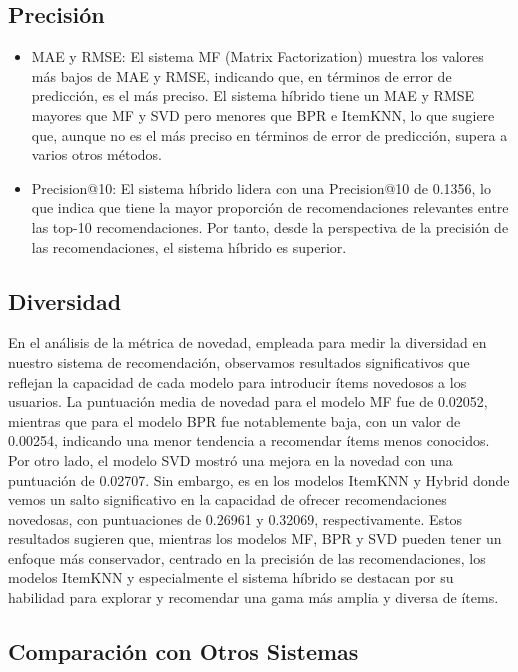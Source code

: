 \documentclass[runningheads]{llncs}
\begin{document}
    \subsection{Precisión}
    \begin{itemize}
    \item MAE y RMSE: El sistema MF (Matrix Factorization) muestra los valores más bajos de MAE y RMSE, indicando que, en términos de error de predicción, es el más preciso. El sistema híbrido tiene un MAE y RMSE mayores que MF y SVD pero menores que BPR e ItemKNN, lo que sugiere que, aunque no es el más preciso en términos de error de predicción, supera a varios otros métodos.
    
    \item Precision@10: El sistema híbrido lidera con una Precision@10 de 0.1356, lo que indica que tiene la mayor proporción de recomendaciones relevantes entre las top-10 recomendaciones. Por tanto, desde la perspectiva de la precisión de las recomendaciones, el sistema híbrido es superior.
    \end{itemize}
    

    \subsection{Diversidad}
    En el análisis de la métrica de novedad, empleada para medir la diversidad en nuestro sistema de recomendación, observamos resultados significativos que reflejan la capacidad de cada modelo para introducir ítems novedosos a los usuarios. La puntuación media de novedad para el modelo MF fue de 0.02052, mientras que para el modelo BPR fue notablemente baja, con un valor de 0.00254, indicando una menor tendencia a recomendar ítems menos conocidos. Por otro lado, el modelo SVD mostró una mejora en la novedad con una puntuación de 0.02707. Sin embargo, es en los modelos ItemKNN y Hybrid donde vemos un salto significativo en la capacidad de ofrecer recomendaciones novedosas, con puntuaciones de 0.26961 y 0.32069, respectivamente. Estos resultados sugieren que, mientras los modelos MF, BPR y SVD pueden tener un enfoque más conservador, centrado en la precisión de las recomendaciones, los modelos ItemKNN y especialmente el sistema híbrido se destacan por su habilidad para explorar y recomendar una gama más amplia y diversa de ítems.

    \subsection{Comparación con Otros Sistemas}
\end{document}

